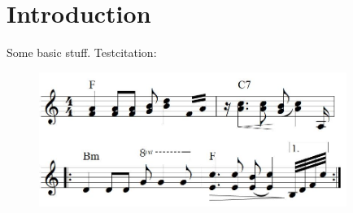 \section{Introduction}
Some basic stuff.
Testcitation: \cite{book:compInt}

\begin{figure}[th]
    \centering
		\includegraphics[width=10cm]{images/logo.jpg}
		\caption[Only to show how it works]{\label{fig:logo}}
\end{figure}
